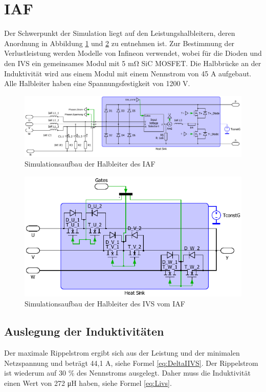 \section{IAF}
	Der Schwerpunkt der Simulation liegt auf den Leistungshalbleitern, deren Anordnung in Abbildung \ref{fig:iafplecsmain} und \ref{fig:iafplecsivs} zu entnehmen ist. Zur Bestimmung der Verlustleistung werden Modelle von Infineon verwendet, wobei für die Dioden und den \gls{IVS} ein gemeinsames Modul mit 5 \si{\milli \ohm} \gls{SiC} \gls{MOSFET}. Die Halbbrücke an der Induktivität wird aus einem Modul mit einem Nennstrom von 45 A aufgebaut. Alle Halbleiter haben eine Spannungsfestigkeit von 1200 V.
	\begin{figure}
		\centering
		\includegraphics[width=1\linewidth]{content/Grafiken/IAF_Plecs_main}
		\caption{Simulationsaufbau der Halbleiter des IAF}
		\label{fig:iafplecsmain}
	\end{figure}
	\begin{figure}
		\centering
		\includegraphics[width=0.9\linewidth]{content/Grafiken/IAF_Plecs_IVS}
		\caption{Simulationsaufbau der Halbleiter des IVS vom IAF}
		\label{fig:iafplecsivs}
	\end{figure}
	

	\subsection{Auslegung der Induktivitäten}
	Der maximale Rippelstrom ergibt sich aus der Leistung und der minimalen Netzspannung und beträgt 44,1 \si{\A}, siehe Formel \ref{eq:DeltaIIVS}. Der Rippelstrom ist wiederum auf 30 \% des Nennstroms ausgelegt. Daher muss die Induktivität einen Wert von 272 \si{\micro \henry} haben, siehe Formel \ref{eq:Livs}. 
		
